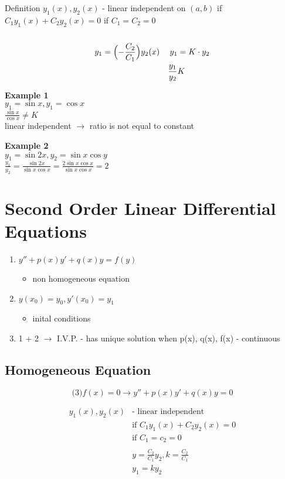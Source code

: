 \documentclass[10pt, letterpaper]{article}
\begin{document}
Definition $y_1(x), y_2(x)$ - linear independent on $(a, b)$ if $C_1y_1(x) + C_2y_2(x) = 0$ if $C_1 = C_2 = 0$\\
\\
\begin{align*}
y_1 &= \Bigl ( -\frac{C_2}{C_1} \Bigl) y_2(x) & y_1 &= K \cdot y_2\\
& & \frac{y_1}{y_2} & K
\end{align*}

\textbf{Example 1}\\
$y_1 = \sin x, y_1 = \cos x$\\
$\frac{\sin x}{\cos x} \neq K$\\
linear independent $\rightarrow$ ratio is not equal to constant

\textbf{Example 2}\\
$y_1 = \sin 2x, y_2 = \sin x \cos y$\\
$\frac{y_1}{y_2} = \frac{\sin 2x}{\sin x \cos x} = \frac{2 \sin x \cos x}{\sin x \cos x} = 2$

\section{Second Order Linear Differential Equations}
\begin{enumerate}
	\item $y'' + p(x)y' + q(x)y = f(y)$
	\begin{itemize}
		\item non homogeneous equation
	\end{itemize}
	\item $y(x_0) = y_0, y'(x_0)=y_1$
	\begin{itemize}
		\item inital conditions
	\end{itemize}
	\item 1 + 2 $\rightarrow$ I.V.P. - has unique solution when p(x), q(x), f(x) - continuous
\end{enumerate}

\subsection{Homogeneous Equation}
\begin{equation*}
\text{(3)} f(x) = 0 \rightarrow y''+p(x)y'+q(x)y=0
\end{equation*}

\begin{align*}
y_1(x), y_2(x) &\text{- linear independent}\\
&\text{if } C_1y_1(x) + C_2y_2(x) = 0\\
&\text{if } C_1 = c_2 = 0\\
\\
&y=\frac{C_2}{C_1}y_2, k = \frac{C_2}{C_1}\\
&y_1 = ky_2
\end{align*}
\end{document}
